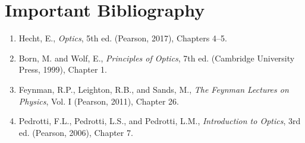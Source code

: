 \section*{Important Bibliography}
\begin{enumerate}
\item Hecht, E., \textit{Optics}, 5th ed. (Pearson, 2017), Chapters 4--5.
\item Born, M. and Wolf, E., \textit{Principles of Optics}, 7th ed. (Cambridge University Press, 1999), Chapter 1.
\item Feynman, R.P., Leighton, R.B., and Sands, M., \textit{The Feynman Lectures on Physics}, Vol. I (Pearson, 2011), Chapter 26.
\item Pedrotti, F.L., Pedrotti, L.S., and Pedrotti, L.M., \textit{Introduction to Optics}, 3rd ed. (Pearson, 2006), Chapter 7.
\end{enumerate}

